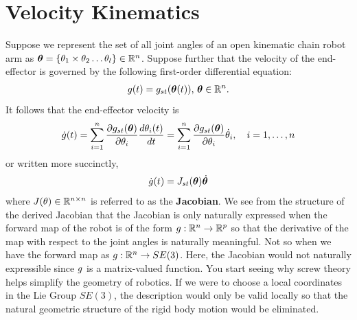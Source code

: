 \section{Velocity Kinematics}

Suppose we represent the set of all joint angles of an open kinematic chain robot arm as $\bm{\theta} = \{\theta_1 \times \theta_2 \ldots \theta_l\} \in \mathbb{R}^n$. Suppose further that the velocity of the end-effector is governed by the following first-order differential equation:
%
\begin{align}
	g(t) = g_{st}(\bm{\theta}(t)), \, \bm{\theta} \in \mathbb{R}^n.
\end{align}
%
It follows that the end-effector velocity is 
%
\begin{align}
	\dot{g}(t) = \sum_{i=1}^{n} \dfrac{\partial g_{st}(\bm{\theta})}{\partial \theta_i} \dfrac{d \theta_i(t)}{d t} =  \sum_{i=1}^{n} \dfrac{\partial g_{st}(\bm{\theta})}{\partial \theta_i} \dot{\theta}_i, \quad i = 1, \ldots, n
	\label{eq:jacob_gen}
\end{align}
%
or written more succinctly,
%
\[
	\dot{g}(t) = J_{st}(\bm{\theta})\dot{\bm{\theta}}
\]
%
where $J(\theta) \in \mathbb{R}^{n\times n}$ is referred to as the \textbf{Jacobian}. We see from the structure of the derived Jacobian that the Jacobian is only naturally expressed when the forward map of the robot is of the form $g: \mathbb{R}^n \rightarrow \mathbb{R}^p$ so that the derivative of the map with respect to the joint angles is naturally meaningful. Not so when we have the forward map as $g: \mathbb{R}^n \rightarrow SE(3)$. Here, the Jacobian would not naturally expressible  since $g$ is a matrix-valued function. You start seeing why screw theory helps simplify the geometry of robotics. If we were to choose a local coordinates in the Lie Group $SE(3)$, the description would only be valid locally so that the natural geometric structure of the rigid body motion would be eliminated.

